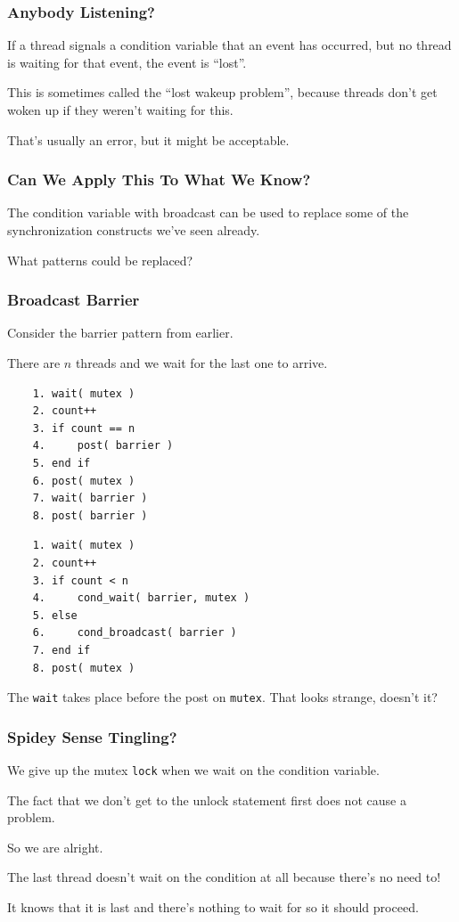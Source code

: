 \begin{frame}
	\frametitle{Anybody Listening?}

	If a thread signals a condition variable that an event has occurred, but no thread is waiting for that event, the event is ``lost''.

	This is sometimes called the ``lost wakeup problem'', because threads don't get woken up if they weren't waiting for this.

	That's usually an error, but it might be acceptable.

\end{frame}

\begin{frame}
	\frametitle{Can We Apply This To What We Know?}

	The condition variable with broadcast can be used to replace some of the synchronization constructs we've seen already.

	What patterns could be replaced?

\end{frame}

\begin{frame}[fragile]
	\frametitle{Broadcast Barrier}

	Consider the barrier pattern from earlier.

	There are $n$ threads and we wait for the last one to arrive.
		{\scriptsize
			\begin{multicols}{2}
				\begin{verbatim}
	1. wait( mutex )
	2. count++
	3. if count == n
	4.     post( barrier )
	5. end if
	6. post( mutex )
	7. wait( barrier )
	8. post( barrier )
  \end{verbatim}
				\columnbreak
				\begin{verbatim}
	1. wait( mutex )
	2. count++
	3. if count < n
	4.     cond_wait( barrier, mutex )
	5. else 
	6.     cond_broadcast( barrier )
	7. end if
	8. post( mutex )
  \end{verbatim}
			\end{multicols}
		}

	The \texttt{wait} takes place before the post on \texttt{mutex}. That looks strange, doesn't it?

\end{frame}


\begin{frame}
	\frametitle{Spidey Sense Tingling?}


	We give up the mutex \texttt{lock} when we wait on the condition variable.

	The fact that we don't get to the unlock statement first does not cause a problem.

	So we are alright.

	The last thread doesn't wait on the condition at all because there's no need to!

	It knows that it is last and there's nothing to wait for so it should proceed.

\end{frame}

